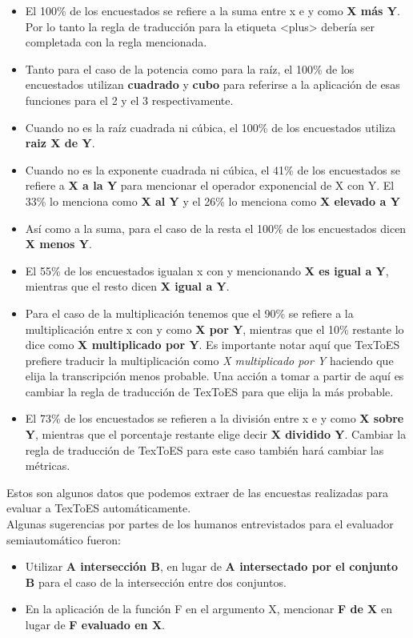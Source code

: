 \begin{itemize}

   \item El 100\% de los encuestados se refiere a la suma entre x e y como \textbf{X más Y}. Por lo tanto la regla de traducción para la etiqueta <plus> debería ser completada con la regla mencionada.
   \item Tanto para el caso de la potencia como para la raíz, el 100\% de los encuestados utilizan \textbf{cuadrado} y \textbf{cubo} para referirse a la aplicación de esas funciones para el 2 y el 3 respectivamente.
   \item Cuando no es la raíz cuadrada ni cúbica, el 100\% de los encuestados utiliza \textbf{raiz X de Y}.
   \item Cuando no es la exponente cuadrada ni cúbica, el 41\% de los encuestados se refiere a \textbf{X a la Y} para mencionar el operador exponencial de X con Y. El 33\% lo menciona como \textbf{X al Y} y el 26\% lo menciona como \textbf{X elevado a Y}
   \item Así como a la suma, para el caso de la resta el 100\% de los encuestados dicen \textbf{X menos Y}.
   \item El 55\% de los encuestados igualan x con y mencionando \textbf{X es igual a Y}, mientras que el resto dicen \textbf{X igual a Y}.
   \item Para el caso de la multiplicación tenemos que el 90\% se refiere a la multiplicación entre x con y como \textbf{X por Y}, mientras que el 10\% restante lo dice como \textbf{X multiplicado por Y}. Es importante notar aquí que TexToES prefiere traducir la multiplicación como\textit{ X multiplicado por Y} haciendo que elija la transcripción menos probable. Una acción a tomar a partir de aquí es cambiar la regla de traducción de TexToES para que elija la más probable.
   \item El 73\% de los encuestados se refieren a la división entre x e y como \textbf{X sobre Y}, mientras que el porcentaje restante elige decir \textbf{X dividido Y}. Cambiar la regla de traducción de TexToES para este caso también hará cambiar las métricas.

\end{itemize}

Estos son algunos datos que podemos extraer de las encuestas realizadas para evaluar a TexToES automáticamente.\\

Algunas sugerencias por partes de los humanos entrevistados para el evaluador semiautomático fueron:
\begin{itemize}
\item Utilizar \textbf{A intersección B}, en lugar de \textbf{A intersectado por el conjunto B} para el caso de la intersección entre dos conjuntos.
\item En la aplicación de la función F en el argumento X, mencionar \textbf{F de X} en lugar de \textbf{F evaluado en X}.
\end{itemize}

